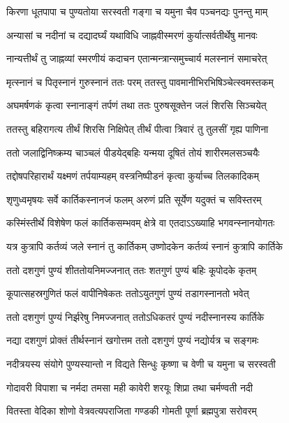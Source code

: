 \twolineshloka
{किरणा धूतपापा च पुण्यतोया सरस्वती}
{गङ्गा च यमुना चैव पञ्चनद्यः पुनन्तु माम्} %

\twolineshloka
{अन्यासां च नदीनां च दद्यादर्घ्यं यथाविधि}
{जाह्नवीस्मरणं कुर्यात्सर्वतीर्थेषु मानवः} %

\twolineshloka
{नान्यत्तीर्थं तु जाह्नव्यां स्मरणीयं कदाचन}
{एतान्मन्त्रान्समुच्चार्य मलस्नानं समाचरेत्} %

\twolineshloka
{मृत्स्नानं च पितृस्नानं गुरुस्नानं ततः परम्}
{ततस्तु पावमानीभिरभिषिञ्चेत्स्वमस्तकम्} %

\twolineshloka
{अघमर्षणकं कृत्वा स्नानाङ्गं तर्पणं तथा}
{ततः पुरुषसूक्तेन जलं शिरसि सिञ्चयेत्} %

\twolineshloka
{ततस्तु बहिरागत्य तीर्थं शिरसि निक्षिपेत्}
{तीर्थं पीत्वा त्रिवारं तु तुलसीं गृह्य पाणिना} %

\twolineshloka
{ततो जलाद्विनिष्क्रम्य चाञ्चलं पीडयेद्बहिः}
{यन्मया दूषितं तोयं शारीरमलसञ्चयैः} %

\twolineshloka
{तद्दोषपरिहारार्थं यक्ष्मणं तर्पयाम्यहम्}
{वस्त्रनिष्पीडनं कृत्वा कुर्याच्च तिलकादिकम्} %


\twolineshloka
{शृणुध्वमृषयः सर्वे कार्तिकस्नानजं फलम्}
{अरुणं प्रति सूर्येण यदुक्तं च सविस्तरम्} %


\twolineshloka
{कस्मिंस्तीर्थे विशेषेण फलं कार्तिकसम्भवम्}
{क्षेत्रे वा एतदाऽऽख्याहि भगवन्स्नानयोगतः} %


\twolineshloka
{यत्र कुत्रापि कर्तव्यं जले स्नानं तु कार्तिकम्}
{उष्णोदकेन कर्तव्यं स्नानं कुत्रापि कार्तिके} %

\twolineshloka
{ततो दशगुणं पुण्यं शीततोयनिमज्जनात्}
{ततः शतगुणं पुण्यं बहिः कूपोदके कृतम्} %

\twolineshloka
{कूपात्सहस्रगुणितं फलं वापीनिषेकतः}
{ततोऽयुतगुणं पुण्यं तडागस्नानतो भवेत्} %

\twolineshloka
{ततो दशगुणं पुण्यं निर्झरेषु निमज्जनात्}
{ततोऽधिकतरं पुण्यं नदीस्नानस्य कार्तिके} %

\twolineshloka
{नद्या दशगुणं प्रोक्तं तीर्थस्नानं खगोत्तम}
{ततो दशगुणं पुण्यं नद्योर्यत्र च सङ्गमः} %

\twolineshloka
{नदीत्रयस्य संयोगे पुण्यस्यान्तो न विद्यते}
{सिन्धुः कृष्णा च वेणी च यमुना च सरस्वती} %

\twolineshloka
{गोदावरी विपाशा च नर्मदा तमसा मही}
{कावेरी शरयूः शिप्रा तथा चर्मण्वती नदी} %

\twolineshloka
{वितस्ता वेदिका शोणो वेत्रवत्यपराजिता}
{गण्डकी गोमती पूर्णा ब्रह्मपुत्रा सरोवरम्} %

